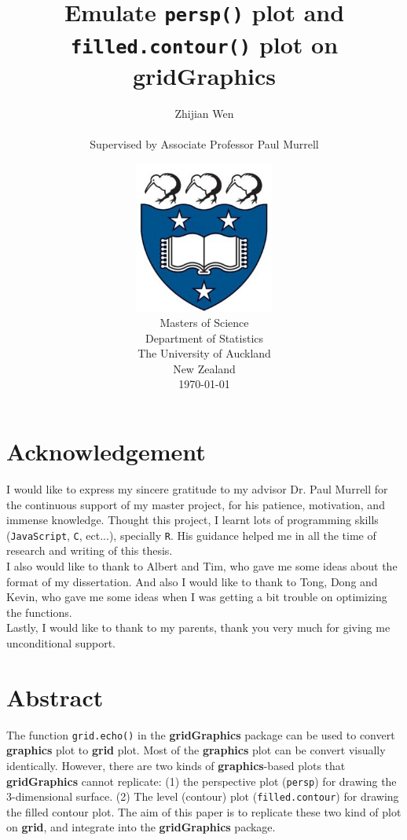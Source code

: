 \documentclass[11pt,twoside]{report}
\title{\huge{Emulate \texttt{persp()} plot and \texttt{filled.contour()} plot on \textbf{gridGraphics}}}
\author{\Large{Zhijian Wen} \\ \\ \Large{Supervised by Associate Professor Paul Murrell}}
\date
{
\vspace{3cm}
\includegraphics[height = 5cm, width = 5cm]{logo.jpg}\\
\vspace{1cm}
Masters of Science\\
Department of Statistics\\
The University of Auckland\\
New Zealand\\
\today\\
}
\begin{document}

\setlength{\parindent}{1pt}
\noindent

\maketitle
\tableofcontents
\listoffigures

\newpage
\pagebreak
\hspace{0pt}
\vfill
\section*{Acknowledgement}
I would like to express my sincere gratitude to my advisor Dr. Paul Murrell for the continuous support of my master project, for his patience, motivation, and immense knowledge. Thought this project, I learnt lots of programming skills (\texttt{JavaScript}, \texttt{C}, ect...), specially \texttt{R}. His guidance helped me in all the time of research and writing of this thesis.\\

I also would like to thank to Albert and Tim, who gave me some ideas about the format of my dissertation. And also I would like to thank to Tong, Dong and Kevin, who gave me some ideas when I was getting a bit trouble on optimizing the functions.\\

Lastly, I would like to thank to my parents, thank you very much for giving me unconditional support. 
\vfill
\hspace{0pt}
\pagebreak

\newpage
\pagebreak
\hspace{0pt}
\vfill
\section*{Abstract}
The function \texttt{grid.echo()} in the \textbf{gridGraphics} package can be used to convert \textbf{graphics} plot to \textbf{grid} plot. Most of the \textbf{graphics} plot can be convert visually identically. However, there are two kinds of \textbf{graphics}-based plots that \textbf{gridGraphics} cannot replicate: (1) the perspective plot (\texttt{persp}) for drawing the 3-dimensional surface. (2) The level (contour) plot (\texttt{filled.contour}) for drawing the filled contour plot. The aim of this paper is to replicate these two kind of plot on \textbf{grid}, and integrate into the \textbf{gridGraphics} package.
\vfill
\hspace{0pt}
\pagebreak
\end{document}
